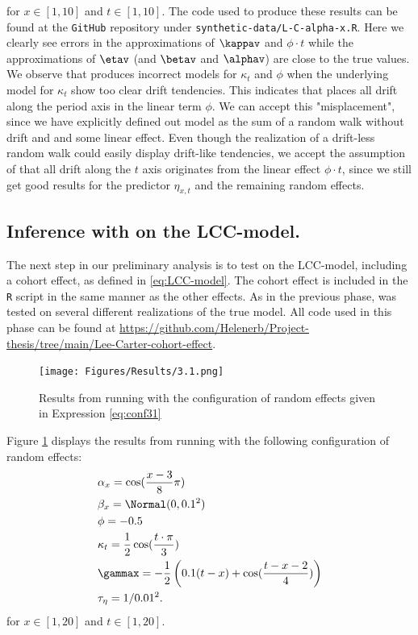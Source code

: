 for $x\in[1,10]$ and $t\in[1,10]$. The code used to produce these results can be found at the \texttt{GitHub} repository under \texttt{synthetic-data/L-C-alpha-x.R}. Here we clearly see errors in the approximations of $\kappav$ and $\phi\cdot t$ while the approximations of $\etav$ (and $\betav$ and $\alphav$) are close to the true values. We observe that \inlabru produces incorrect models for $\kappa_t$ and $\phi$ when the underlying model for $\kappa_t$ show too clear drift tendencies. This indicates that \inlabru places all drift along the period axis in the linear term $\phi$. We can accept this "misplacement", since we have explicitly defined out model as the sum of a random walk without drift and and some linear effect. Even though the realization of a drift-less random walk could easily display drift-like tendencies, we accept the assumption of \inlabru that all drift along the $t$ axis originates from the linear effect $\phi \cdot t$, since we still get good results for the predictor $\eta_{x,t}$ and the remaining random effects.

\newline
\subsection{Inference with \inlabru on the LCC-model. }
The next step in our preliminary analysis is to test \inlabru on the LCC-model, including a cohort effect, as defined in \ref{eq:LCC-model}. The cohort effect is included in the \texttt{R} script in the same manner as the other effects. As in the previous phase, \inlabru was tested on several different realizations of the true model. All code used in this phase can be found at \url{https://github.com/Helenerb/Project-thesis/tree/main/Lee-Carter-cohort-effect}.
\begin{figure}[h!]
    \centering
    \texttt{[image: Figures/Results/3.1.png]}
    \caption{Results from running \inlabru with the configuration of random effects given in Expression \ref{eq:conf31}}
    \label{fig:conf31}
\end{figure}
Figure \ref{fig:conf31} displays the results from running \inlabru with the following configuration of random effects:
\begin{equation}
    \begin{aligned}
        &\alpha_x = \cos(\frac{x-3}{8}\pi)\\
        &\beta_x = \Normal(0,0.1^2)\\
        &\phi = -0.5\\
        &\kappa_t = \frac{1}{2}\cos(\frac{t\cdot \pi}{3})\\
        &\gammax = -\frac{1}{2}\left( 0.1(t-x) + \cos(\frac{t-x-2}{4})\right)\\
        &\tau_{\eta} = 1/0.01^2.
    \end{aligned}
    \label{eq:conf31}
\end{equation}
for $x\in[1,20]$ and $t \in [1,20]$. 

